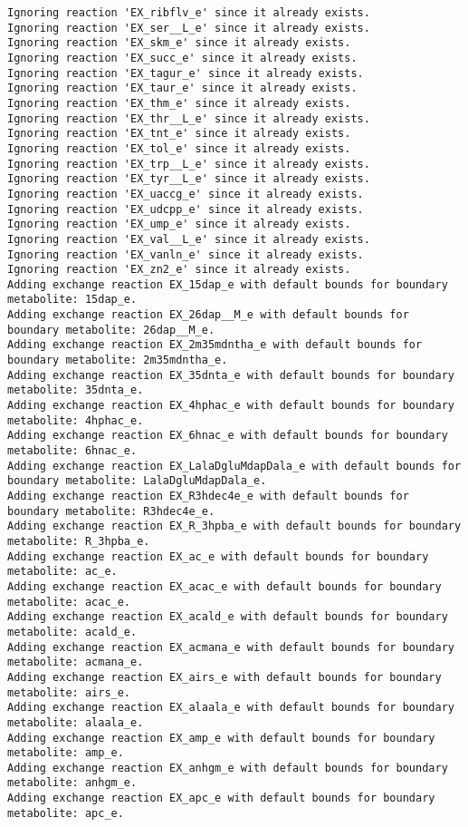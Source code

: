\documentclass[
  letterpaper,
  DIV=11,
  numbers=noendperiod]{scrartcl}
\begin{document}
\begin{verbatim}
Ignoring reaction 'EX_ribflv_e' since it already exists.
Ignoring reaction 'EX_ser__L_e' since it already exists.
Ignoring reaction 'EX_skm_e' since it already exists.
Ignoring reaction 'EX_succ_e' since it already exists.
Ignoring reaction 'EX_tagur_e' since it already exists.
Ignoring reaction 'EX_taur_e' since it already exists.
Ignoring reaction 'EX_thm_e' since it already exists.
Ignoring reaction 'EX_thr__L_e' since it already exists.
Ignoring reaction 'EX_tnt_e' since it already exists.
Ignoring reaction 'EX_tol_e' since it already exists.
Ignoring reaction 'EX_trp__L_e' since it already exists.
Ignoring reaction 'EX_tyr__L_e' since it already exists.
Ignoring reaction 'EX_uaccg_e' since it already exists.
Ignoring reaction 'EX_udcpp_e' since it already exists.
Ignoring reaction 'EX_ump_e' since it already exists.
Ignoring reaction 'EX_val__L_e' since it already exists.
Ignoring reaction 'EX_vanln_e' since it already exists.
Ignoring reaction 'EX_zn2_e' since it already exists.
Adding exchange reaction EX_15dap_e with default bounds for boundary metabolite: 15dap_e.
Adding exchange reaction EX_26dap__M_e with default bounds for boundary metabolite: 26dap__M_e.
Adding exchange reaction EX_2m35mdntha_e with default bounds for boundary metabolite: 2m35mdntha_e.
Adding exchange reaction EX_35dnta_e with default bounds for boundary metabolite: 35dnta_e.
Adding exchange reaction EX_4hphac_e with default bounds for boundary metabolite: 4hphac_e.
Adding exchange reaction EX_6hnac_e with default bounds for boundary metabolite: 6hnac_e.
Adding exchange reaction EX_LalaDgluMdapDala_e with default bounds for boundary metabolite: LalaDgluMdapDala_e.
Adding exchange reaction EX_R3hdec4e_e with default bounds for boundary metabolite: R3hdec4e_e.
Adding exchange reaction EX_R_3hpba_e with default bounds for boundary metabolite: R_3hpba_e.
Adding exchange reaction EX_ac_e with default bounds for boundary metabolite: ac_e.
Adding exchange reaction EX_acac_e with default bounds for boundary metabolite: acac_e.
Adding exchange reaction EX_acald_e with default bounds for boundary metabolite: acald_e.
Adding exchange reaction EX_acmana_e with default bounds for boundary metabolite: acmana_e.
Adding exchange reaction EX_airs_e with default bounds for boundary metabolite: airs_e.
Adding exchange reaction EX_alaala_e with default bounds for boundary metabolite: alaala_e.
Adding exchange reaction EX_amp_e with default bounds for boundary metabolite: amp_e.
Adding exchange reaction EX_anhgm_e with default bounds for boundary metabolite: anhgm_e.
Adding exchange reaction EX_apc_e with default bounds for boundary metabolite: apc_e.

\end{verbatim}
\end{document}
